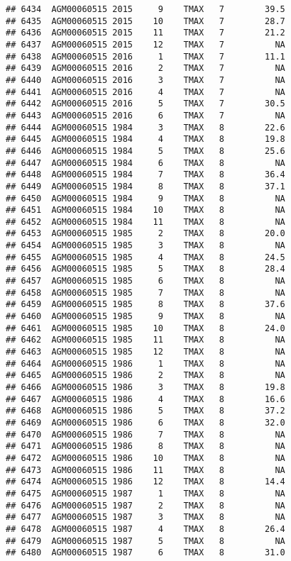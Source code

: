 \documentclass{article}\usepackage[]{graphicx}\usepackage[]{color}
\makeatletter
\newenvironment{kframe}{%
 \def\at@end@of@kframe{}%
 \ifinner\ifhmode%
  \def\at@end@of@kframe{\end{minipage}}%
  \begin{minipage}{\columnwidth}%
 \fi\fi%
 \def\FrameCommand##1{\hskip\@totalleftmargin \hskip-\fboxsep
 \colorbox{shadecolor}{##1}\hskip-\fboxsep
     \hskip-\linewidth \hskip-\@totalleftmargin \hskip\columnwidth}%
 \MakeFramed {\advance\hsize-\width
   \@totalleftmargin\z@ \linewidth\hsize
   \@setminipage}}%
 {\par\unskip\endMakeFramed%
 \at@end@of@kframe}
\newenvironment{knitrout}{}{} %
\makeatother
\begin{document}
\begin{knitrout}
\begin{kframe}
\begin{verbatim}
## 6434  AGM00060515 2015     9    TMAX   7        39.5
## 6435  AGM00060515 2015    10    TMAX   7        28.7
## 6436  AGM00060515 2015    11    TMAX   7        21.2
## 6437  AGM00060515 2015    12    TMAX   7          NA
## 6438  AGM00060515 2016     1    TMAX   7        11.1
## 6439  AGM00060515 2016     2    TMAX   7          NA
## 6440  AGM00060515 2016     3    TMAX   7          NA
## 6441  AGM00060515 2016     4    TMAX   7          NA
## 6442  AGM00060515 2016     5    TMAX   7        30.5
## 6443  AGM00060515 2016     6    TMAX   7          NA
## 6444  AGM00060515 1984     3    TMAX   8        22.6
## 6445  AGM00060515 1984     4    TMAX   8        19.8
## 6446  AGM00060515 1984     5    TMAX   8        25.6
## 6447  AGM00060515 1984     6    TMAX   8          NA
## 6448  AGM00060515 1984     7    TMAX   8        36.4
## 6449  AGM00060515 1984     8    TMAX   8        37.1
## 6450  AGM00060515 1984     9    TMAX   8          NA
## 6451  AGM00060515 1984    10    TMAX   8          NA
## 6452  AGM00060515 1984    11    TMAX   8          NA
## 6453  AGM00060515 1985     2    TMAX   8        20.0
## 6454  AGM00060515 1985     3    TMAX   8          NA
## 6455  AGM00060515 1985     4    TMAX   8        24.5
## 6456  AGM00060515 1985     5    TMAX   8        28.4
## 6457  AGM00060515 1985     6    TMAX   8          NA
## 6458  AGM00060515 1985     7    TMAX   8          NA
## 6459  AGM00060515 1985     8    TMAX   8        37.6
## 6460  AGM00060515 1985     9    TMAX   8          NA
## 6461  AGM00060515 1985    10    TMAX   8        24.0
## 6462  AGM00060515 1985    11    TMAX   8          NA
## 6463  AGM00060515 1985    12    TMAX   8          NA
## 6464  AGM00060515 1986     1    TMAX   8          NA
## 6465  AGM00060515 1986     2    TMAX   8          NA
## 6466  AGM00060515 1986     3    TMAX   8        19.8
## 6467  AGM00060515 1986     4    TMAX   8        16.6
## 6468  AGM00060515 1986     5    TMAX   8        37.2
## 6469  AGM00060515 1986     6    TMAX   8        32.0
## 6470  AGM00060515 1986     7    TMAX   8          NA
## 6471  AGM00060515 1986     8    TMAX   8          NA
## 6472  AGM00060515 1986    10    TMAX   8          NA
## 6473  AGM00060515 1986    11    TMAX   8          NA
## 6474  AGM00060515 1986    12    TMAX   8        14.4
## 6475  AGM00060515 1987     1    TMAX   8          NA
## 6476  AGM00060515 1987     2    TMAX   8          NA
## 6477  AGM00060515 1987     3    TMAX   8          NA
## 6478  AGM00060515 1987     4    TMAX   8        26.4
## 6479  AGM00060515 1987     5    TMAX   8          NA
## 6480  AGM00060515 1987     6    TMAX   8        31.0

\end{verbatim}
\end{kframe}
\end{knitrout}
\end{document}
